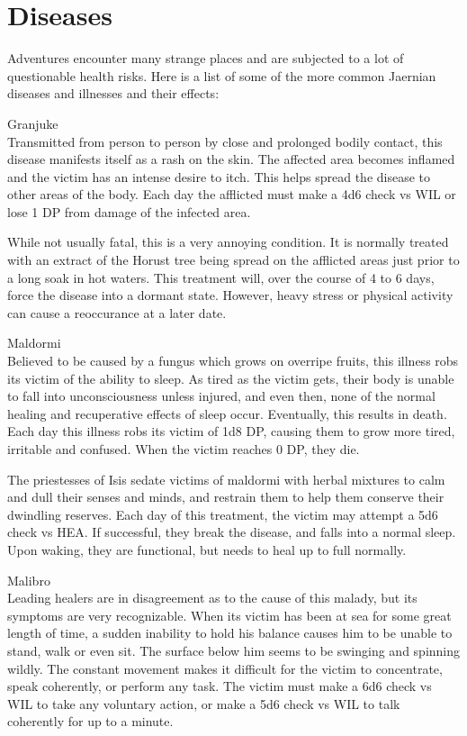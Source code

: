 \section{Diseases}
Adventures encounter many strange places and are subjected to a lot of questionable health risks. Here is a list of some of the more common Jaernian diseases and illnesses and their effects:

Granjuke\\
Transmitted from person to person by close and prolonged bodily contact, this disease manifests itself as a rash on the skin. The affected area becomes inflamed and the victim has an intense desire to itch. This helps spread the disease to other areas of the body. Each day the afflicted must make a 4d6 check vs WIL or lose 1 DP from damage of the infected area. 

While not usually fatal, this is a very annoying condition. It is normally treated with an extract of the Horust tree being spread on the afflicted areas just prior to a long soak in hot waters. This treatment will, over the course of 4 to 6 days, force the disease into a dormant state. However, heavy stress or physical activity can cause a reoccurance at a later date.

Maldormi\\
Believed to be caused by a fungus which grows on overripe fruits, this illness robs its victim of the ability to sleep. As tired as the victim gets, their body is unable to fall into unconsciousness unless injured, and even then, none of the normal healing and recuperative effects of sleep occur. Eventually, this results in death. Each day this illness robs its victim of 1d8  DP, causing them to grow more tired, irritable and confused. When the victim reaches 0 DP, they die.

The priestesses of Isis sedate victims of maldormi with herbal mixtures to calm and dull their senses and minds, and restrain them to help them conserve their dwindling reserves. Each day of this treatment, the victim may attempt a 5d6 check vs HEA. If successful, they break the disease, and falls into a normal sleep. Upon waking, they are functional, but needs to heal up to full normally.

Malibro\\
Leading healers are in disagreement as to the cause of this malady, but its symptoms are very recognizable. When its victim has been at sea for some great length of time, a sudden inability to hold his balance causes him to be unable to stand, walk or even sit. The surface below him seems to be swinging and spinning wildly. The constant movement makes it difficult for the victim to concentrate, speak coherently, or perform any task. The victim must make a 6d6 check vs WIL to take any voluntary action, or make a 5d6 check vs WIL to talk coherently for up to a minute.

